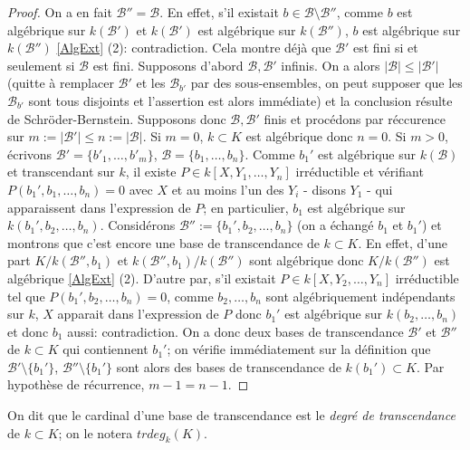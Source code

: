 \begin{proof}
 On a en fait $\mathcal{B}''=\mathcal{B}$. En effet, s'il existait $b\in \mathcal{B}\setminus \mathcal{B}''$, comme $b$ est algébrique sur $k(\mathcal{B}')$ et $k(\mathcal{B}')$ est algébrique sur $k(\mathcal{B}'')$, $b$ est algébrique sur $k(\mathcal{B}'')$ \ref{AlgExt} (2):  contradiction. Cela montre déjà que $\mathcal{B}'$ est fini si et seulement si $\mathcal{B}$ est fini. Supposons d'abord $\mathcal{B},\mathcal{B}'$ infinis. On a alors $|\mathcal{B}|\leq |\mathcal{B}'|$ (quitte à remplacer $\mathcal{B}'$  et les $\mathcal{B}_{b'}$ par des sous-ensembles, on peut supposer que les $\mathcal{B}_{b'}$ sont tous disjoints et l'assertion est alors immédiate) et la conclusion résulte de Schr\"{o}der-Bernstein. Supposons donc $\mathcal{B},\mathcal{B}'$ finis et procédons par réccurence sur $m:=|\mathcal{B}'|\leq n:=|\mathcal{B}|$. Si $m=0$, $k\subset K$ est algébrique donc $n=0$. Si $m>0$, écrivons $\mathcal{B}'=\lbrace b'_1,\dots, b'_m\rbrace$, $\mathcal{B}=\lbrace b_1,\dots, b_n\rbrace$. Comme $b_1'$ est algébrique sur $k(\mathcal{B})$ et transcendant sur $k$, il existe $P\in k[X,Y_1,\dots, Y_n]$ irréductible et vérifiant $P(b_1',b_1,\dots, b_n)=0$ avec   $X$ et au moins l'un des $Y_i$ - disons $Y_1$ - qui apparaissent dans l'expression de $P$; en particulier, $b_1$ est algébrique sur $k(b_1',b_2,\dots, b_n)$. Considérons $\mathcal{B}'':=\lbrace b_1',b_2,\dots, b_n\rbrace$ (on a échangé $b_1$ et $b_1'$) et montrons que c'est encore une base de transcendance de $k\subset K$. En effet,  d'une part $K/k(\mathcal{B}'',b_1)$ et $k(\mathcal{B}'',b_1)/k(\mathcal{B}'')$ sont algébrique donc $K/k(\mathcal{B}'')$ est algébrique \ref{AlgExt} (2). D'autre par, s'il existait $P\in k[X,Y_2,\dots, Y_n]$ irréductible tel que $P(b_1',b_2,\dots, b_n)=0$, comme $ b_2,\dots, b_n$ sont algébriquement indépendants sur $k$, $X$  apparait dans l'expression de $P$ donc $b_1' $ est algébrique sur $k(b_2,\dots, b_n)$ et donc $b_1$ aussi: contradiction. On a donc deux bases de transcendance $\mathcal{B}'$ et $\mathcal{B}''$ de $k\subset K$ qui contiennent $b_1'$; on vérifie immédiatement sur la définition que $\mathcal{B}'\setminus \lbrace b_1'\rbrace$, $\mathcal{B}''\setminus \lbrace b_1'\rbrace$ sont alors des bases de transcendance de $k(b_1')\subset K$. Par hypothèse de récurrence, $m-1=n-1$.  \end{proof}


  On dit que le cardinal d'une base de transcendance est le \textit{degré de transcendance} de $k\subset K$; on le notera $trdeg_k(K)$.\\

